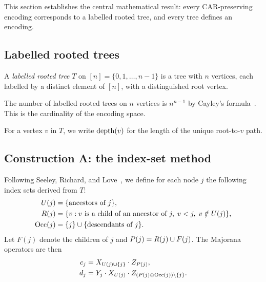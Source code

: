 %

This section establishes the central mathematical result: every
CAR-preserving encoding corresponds to a labelled rooted tree, and
every tree defines an encoding.

\subsection{Labelled rooted trees}
\label{sec:te-trees}

\begin{definition}
A \emph{labelled rooted tree} $T$ on $[n] = \{0, 1, \ldots, n{-}1\}$
is a tree with $n$ vertices, each labelled by a distinct element of
$[n]$, with a distinguished root vertex.
\end{definition}

The number of labelled rooted trees on $n$ vertices is $n^{n-1}$ by
Cayley's formula~\cite{cayley1889}.  This is the cardinality of the
encoding space.

For a vertex $v$ in $T$, we write $\mathrm{depth}(v)$ for the length of the
unique root-to-$v$ path.

\subsection{Construction A: the index-set method}
\label{sec:te-indexset}

Following Seeley, Richard, and Love~\cite{seeley2012}, we define for
each node $j$ the following index sets derived from $T$:
%
\begin{align}
  U(j) &= \{\text{ancestors of } j\}, \label{eq:update-set} \\
  R(j) &= \{v : v \text{ is a child of an ancestor of } j,\;
               v < j,\; v \notin U(j)\}, \\
  \mathrm{Occ}(j)  &= \{j\} \cup \{\text{descendants of } j\}.
\end{align}
%
Let $F(j)$ denote the children of $j$ and
$P(j) = R(j) \cup F(j)$.  The Majorana operators are then
%
\begin{align}
  c_j &= X_{U(j) \cup \{j\}} \cdot Z_{P(j)},
    \label{eq:cj-indexset} \\
  d_j &= Y_j \cdot X_{U(j)} \cdot
         Z_{(P(j) \oplus \mathrm{Occ}(j)) \setminus \{j\}}.
    \label{eq:dj-indexset}
\end{align}

